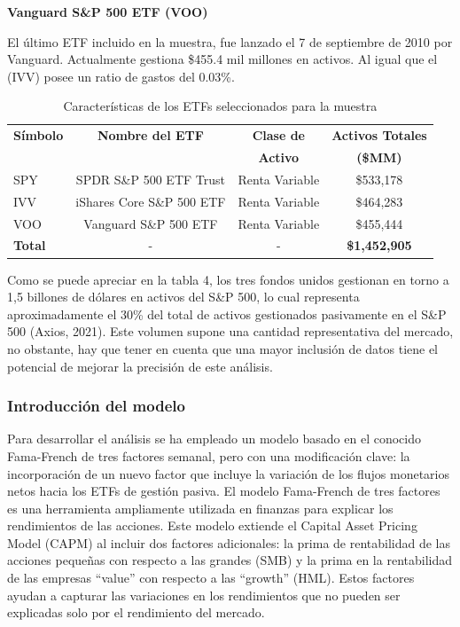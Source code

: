\documentclass[12pt,a4paper]{article}
\begin{document}
\textbf{Vanguard S\&P 500 ETF (VOO)}

El último ETF incluido en la muestra, fue lanzado el 7 de septiembre de 2010 por Vanguard. Actualmente gestiona \$455.4 mil millones en activos. Al igual que el (IVV) posee un ratio de gastos del 0.03\%.

\begin{table}[H]
\centering
\caption{Características de los ETFs seleccionados para la muestra}
\label{tab:etf_characteristics}
\small
\begin{tabular}{lccc}
\toprule
\textbf{Símbolo} & \textbf{Nombre del ETF} & \textbf{Clase de} & \textbf{Activos Totales} \\
 & & \textbf{Activo} & \textbf{(\$MM)} \\
\midrule
SPY & SPDR S\&P 500 ETF Trust & Renta Variable & \$533,178 \\
IVV & iShares Core S\&P 500 ETF & Renta Variable & \$464,283 \\
VOO & Vanguard S\&P 500 ETF & Renta Variable & \$455,444 \\
\midrule
\textbf{Total} & - & - & \textbf{\$1,452,905} \\
\bottomrule
\end{tabular}
\end{table}

Como se puede apreciar en la tabla 4, los tres fondos unidos gestionan en torno a 1,5 billones de dólares en activos del S\&P 500, lo cual representa aproximadamente el 30\% del total de activos gestionados pasivamente en el S\&P 500 (Axios, 2021). Este volumen supone una cantidad representativa del mercado, no obstante, hay que tener en cuenta que una mayor inclusión de datos tiene el potencial de mejorar la precisión de este análisis.

\subsubsection*{Introducción del modelo}

Para desarrollar el análisis se ha empleado un modelo basado en el conocido Fama-French de tres factores semanal, pero con una modificación clave: la incorporación de un nuevo factor que incluye la variación de los flujos monetarios netos hacia los ETFs de gestión pasiva. El modelo Fama-French de tres factores es una herramienta ampliamente utilizada en finanzas para explicar los rendimientos de las acciones. Este modelo extiende el Capital Asset Pricing Model (CAPM) al incluir dos factores adicionales: la prima de rentabilidad de las acciones pequeñas con respecto a las grandes (SMB) y la prima en la rentabilidad de las empresas ``value'' con respecto a las ``growth'' (HML). Estos factores ayudan a capturar las variaciones en los rendimientos que no pueden ser explicadas solo por el rendimiento del mercado.
\end{document}
